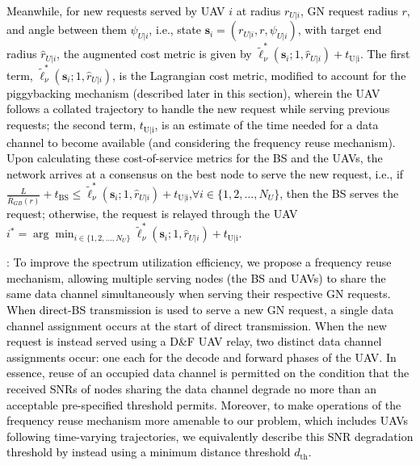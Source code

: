 \documentclass[12pt, draftcls, onecolumn]{IEEEtran}
\theoremstyle{plain}
\theoremstyle{definition}
\theoremstyle{remark}
\newcommand\hlt[1]{\textcolor{black}{#1}}
\begin{document}
\hlt{Meanwhile, for new requests served by UAV $i$ at radius $r_{U|i}$, GN request radius $r$, and angle between them $\psi_{U|i}$, i.e., state $\mathbf s_i = (r_{U|i}, r, \psi_{U|i})$, with target end radius $\hat r_{U|i}$, the augmented cost metric is given by $\tilde{\ell}_{\nu}^* (\mathbf s_i; 1, \hat r_{U|i}) + t_{\mathrm{U|i}}$. The first term, $\tilde{\ell}_{\nu}^* (\mathbf s_i; 1, \hat r_{U|i})$, is the Lagrangian cost metric, modified to account for the piggybacking mechanism (described later in this section), wherein the UAV follows a collated trajectory to handle the new request while serving previous requests; the second term, $t_{\mathrm{U|i}}$, is an estimate of the time needed for a data channel to become available (and considering the frequency reuse mechanism). Upon calculating these cost-of-service metrics for the BS and the UAVs, the network arrives at a consensus on the best node to serve the new request, i.e., if $\frac{L}{\bar{R}_{GB} (r)}{+}t_{\mathrm{BS}}{\leq}\tilde{\ell}_{\nu}^* (\mathbf s_i; 1, \hat r_{U|i}){+}t_{\mathrm{U|i}}$,${\forall}i{\in}\{1,2,{\dots},N_U\}$, then the BS serves the request; otherwise, the request is relayed through the UAV $i^*{=}\arg\min_{i{\in}\{1,2,{\dots},N_U\}}\tilde{\ell}_{\nu}^* (\mathbf s_i; 1, \hat r_{U|i}) + t_{\mathrm{U|i}}$.}

\label{freq_reuse_label}
\noindent{\hlt{\textbf{Frequency Reuse}}}: \hlt{To improve the spectrum utilization efficiency, we propose a frequency reuse mechanism, allowing multiple serving nodes (the BS and UAVs) to share the same data channel simultaneously when serving their respective GN requests. When direct-BS transmission is used to serve a new GN request, a single data channel assignment occurs at the start of direct transmission. When the new request is instead served using a D\&F UAV relay, two distinct data channel assignments occur: one each for the decode and forward phases of the UAV. In essence, reuse of an occupied data channel is permitted on the condition that the received SNRs of nodes sharing the data channel degrade no more than an acceptable pre-specified threshold permits. Moreover, to make operations of the frequency reuse mechanism more amenable to our problem, which includes UAVs following time-varying trajectories, we equivalently describe this SNR degradation threshold by instead using a minimum distance threshold $d_{\mathrm{th}}$.}
\end{document}
